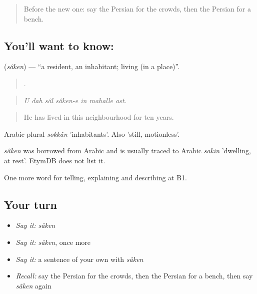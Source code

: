 \label{lesson:FA-C451-saken}



\begin{quote}
Before the new one: say the Persian for the crowds, then the Persian for a bench.
\end{quote}

\subsection*{You'll want to know: }
\textbf{} (\emph{sâken}) — \textquotedblleft{}a resident, an inhabitant; living (in a place)\textquotedblright{}.

\begin{quote}
      .
\end{quote}

\begin{quote}
\emph{U dah sâl sâken-e in mahalle ast.}
\end{quote}

\begin{quote}
He has lived in this neighbourhood for ten years.
\end{quote}

Arabic plural \emph{sokkân} 'inhabitants'. Also 'still, motionless'.

\begin{cousinweb}
\emph{sâken} was borrowed from Arabic and is usually traced to Arabic \emph{sākin} 'dwelling, at rest'. EtymDB does not list it.
\end{cousinweb}

\begin{grammarlens}[title={What you've built}]
One more word for telling, explaining and describing at B1.
\end{grammarlens}

\subsection*{Your turn}
\begin{itemize}
\raggedright
  \item \emph{Say it:} \emph{sâken}
  \item \emph{Say it:} \emph{sâken}, once more
  \item \emph{Say it:} a sentence of your own with \emph{sâken}
  \item \emph{Recall:} say the Persian for the crowds, then the Persian for a bench, then say \emph{sâken} again
\end{itemize}

